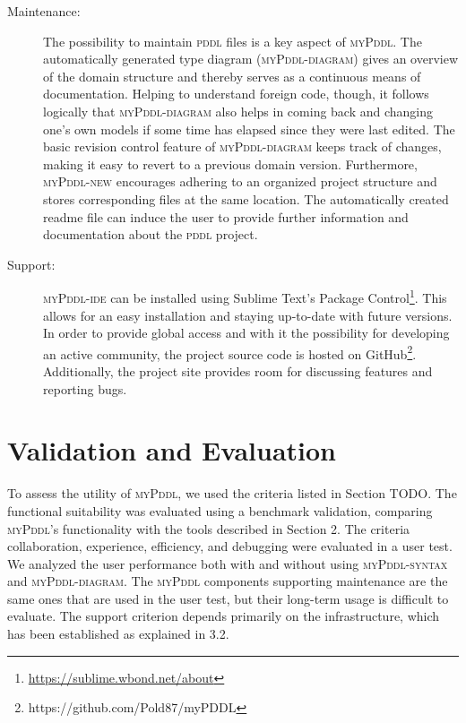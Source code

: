 \documentclass[runningheads]{llncs}
\newcommand{\mypddl}{\textsc{myPddl}\xspace}
\newcommand{\mypddlsyntax}{\textsc{myPddl-syntax}\xspace}
\newcommand{\mypddldiagram}{\textsc{myPddl-diagram}\xspace}
\newcommand{\mypddlnew}{\textsc{myPddl-new}\xspace}
\newcommand{\mypddlide}{\textsc{myPddl-ide}\xspace}
\newcommand{\pddl}{\textsc{pddl}\xspace}
\newcommand{\sublimetext}{Sublime Text\xspace}
\begin{document}
\begin{description}
\item[Maintenance:] The possibility to maintain \pddl files is a key
  aspect of \mypddl. The automatically generated type diagram
  (\mypddldiagram) gives an overview of the domain structure and
  thereby serves as a continuous means of documentation. Helping to
  understand foreign code, though, it follows logically that
  \mypddldiagram also helps in coming back and changing one’s own
  models if some time has elapsed since they were last edited. The
  basic revision control feature of \mypddldiagram keeps track of
  changes, making it easy to revert to a previous domain
  version. Furthermore, \mypddlnew encourages adhering to an organized
  project structure and stores corresponding files at the same
  location.  The automatically created readme file can induce the user
  to provide further information and documentation about the \pddl
  project.

\item[Support:] \mypddlide can be installed using \sublimetext's
  Package
  Control\footnote{\url{https://sublime.wbond.net/about}}. This allows
  for an easy installation and staying up-to-date with future
  versions. In order to provide global access and with it the
  possibility for developing an active community, the project source
  code is hosted on
  GitHub\footnote{https://github.com/Pold87/myPDDL}. Additionally, the
  project site provides room for discussing features and reporting
  bugs.

\end{description}

\section{Validation and Evaluation}
\label{sec:valid-eval}

To assess the utility of \mypddl, we used the criteria listed in
Section TODO. The functional suitability was evaluated using a
benchmark validation, comparing \mypddl's functionality with the tools
described in Section 2. The criteria collaboration, experience,
efficiency, and debugging were evaluated in a user test. We analyzed
the user performance both with and without using \mypddlsyntax and
\mypddldiagram. The \mypddl components supporting maintenance are the
same ones that are used in the user test, but their long-term usage is
difficult to evaluate. The support criterion depends primarily on the
infrastructure, which has been established as explained in 3.2.
\end{document}
